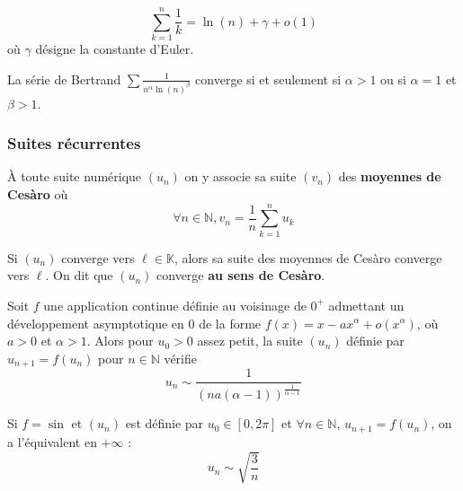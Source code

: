 	\begin{application}
		\[ \sum_{k=1}^n \frac{1}{k} = \ln(n) + \gamma + o (1) \]
		où $\gamma$ désigne la constante d'Euler.
	\end{application}

	\begin{application}
		La série de Bertrand $\sum \frac{1}{n^\alpha \ln(n)^\beta}$ converge si et seulement si $\alpha > 1$ ou si $\alpha = 1$ et $\beta > 1$.
	\end{application}
	
	\newpage

	\subsubsection{Suites récurrentes}


	\begin{definition}
		À toute suite numérique $(u_n)$ on y associe sa suite $(v_n)$ des \textbf{moyennes de Cesàro} où
		\[ \forall n \in \mathbb{N}, v_n = \frac{1}{n} \sum_{k=1}^{n} u_k \]
	\end{definition}

	\begin{theorem}
		Si $(u_n)$ converge vers $\ell \in \mathbb{K}$, alors sa suite des moyennes de Cesàro converge vers $\ell$. On dit que $(u_n)$ converge \textbf{au sens de Cesàro}.
	\end{theorem}


	\begin{proposition}
		Soit $f$ une application continue définie au voisinage de $0^+$ admettant
		un développement asymptotique en $0$ de la forme $f(x) = x - ax^\alpha + o(x^\alpha)$, où $a > 0$ et $\alpha > 1$. Alors pour $u_0 > 0$ assez petit, la suite $(u_n)$ définie par $u_{n+1} = f(u_n)$ pour $n \in \mathbb{N}$ vérifie
		\[ u_n \sim \frac{1}{(na(\alpha-1))^{\frac{1}{\alpha-1}}} \]
	\end{proposition}

	\begin{example}
		Si $f = \sin$ et $(u_n)$ est définie par $u_0 \in [0, 2\pi]$ et $\forall n \in \mathbb{N}, \, u_{n+1} = f(u_n)$, on a l'équivalent en $+\infty$ :
		\[ u_n \sim \sqrt{\frac{3}{n}} \]
	\end{example}


